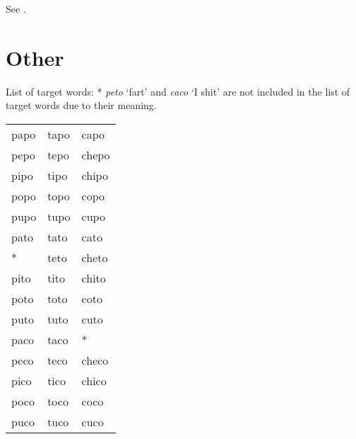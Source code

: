 \documentclass[11pt,]{article}
\begin{document}
See .

\hypertarget{other}{%
\section{Other}\label{other}}

\label{s:other}

List of target words: * \emph{peto} `fart' and \emph{caco} `I shit' are
not included in the list of target words due to their meaning.

\begin{tabular}{lll}
papo & tapo & capo  \\
pepo & tepo & chepo \\
pipo & tipo & chipo \\
popo & topo & copo  \\
pupo & tupo & cupo  \\
pato & tato & cato  \\
*    & teto & cheto \\
pito & tito & chito \\
poto & toto & coto  \\
puto & tuto & cuto  \\
paco & taco & *     \\
peco & teco & checo \\
pico & tico & chico \\
poco & toco & coco  \\
puco & tuco & cuco
\end{tabular}


\end{document}
